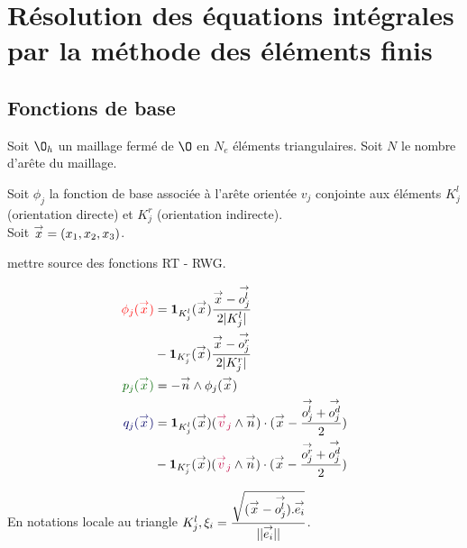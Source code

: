 \section{Résolution des équations intégrales par la méthode des éléments finis}
  \subsection{Fonctions de base}
    Soit \(\O_h\) un maillage fermé de \(\O\) en \(N_e\) éléments triangulaires. Soit \(N\) le nombre d'arête du maillage.

    Soit \(\phi_j\) la fonction de base associée à l’arête orientée \(v_j\) conjointe aux éléments  \(K_j^l\) (orientation directe) et \(K_j^r\) (orientation indirecte).\\

    Soit \(\vx = (x_1,x_2,x_3)\).

    \begin{TODO}
      mettre source des fonctions RT - RWG.
    \end{TODO}


    \begin{minipage}{0.58\textwidth}
      \centering
      \begin{tikzpicture}[scale=2.5]
        
      \end{tikzpicture}
    \end{minipage} 
    \begin{minipage}{0.4\textwidth}
      \begin{align*}
        \color{red}{\phi_j(\vx)} &= \mathbf{1}_{K_j^l}(\vx)\frac{\vx-\vect{o_j^l}}{2|K_j^l|} \\&- \mathbf{1}_{K_j^r}(\vx)\frac{\vx-\vect{o_j^r}}{2|K_j^r|}\\
        \color{black!60!green}{p_j(\vx)} &= -\vn \pvect \phi_j(\vx)\\
        \color{black!60!blue}{q_j(\vx)} &= \mathbf{1}_{K_j^l}(\vx) ( { \color{purple}{\vect{v}_j } } \pvect \vn ) \cdot ( \vx - \frac{\vect{o^l_j} + \vect{o^d_j}}{2} ) \\
        &- \mathbf{1}_{K_j^r}(\vx) ( { \color{purple}{\vect{v}_j } } \pvect \vn ) \cdot ( \vx - \frac{\vect{o^r_j} + \vect{o^d_j}}{2} )
      \end{align*}
    \end{minipage}

    En notations locale au triangle \(K_j^l, \xi_i = \frac{\sqrt{(\vx-\vect{o^l_j}).\vect{e_i}}}{||\vect{e_i}||}\).

